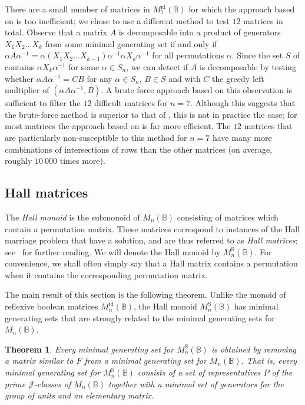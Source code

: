 \documentclass[11pt]{article}
\newtheorem{thm}{Theorem}[subsection]
\numberwithin{equation}{section}
\newcommand{\B}{\mathbb{B}}
\newcommand{\Bn}{M_n(\B)}
\newcommand{\Refln}{M_n^{\text{id}}(\B)}
\newcommand{\Refl}[1]{M_{#1}^{\text{id}}(\B)}
\newcommand{\Halln}{M_n^{\text{S}}(\B)}
\newcommand{\J}{\mathscr{J}}
\begin{document}
There are a small number of matrices in $\Refl{7}$ for which the approach based on
 is too inefficient; we chose to use a
different method to test $12$ matrices in total. Observe that a matrix $A$ is
decomposable into a product of generators $X_1 X_2 \ldots X_k$ from some minimal
generating set if and only if $\alpha A \alpha^{-1} = \alpha (X_1 X_2 \ldots
X_{k-1})\alpha^{-1}\alpha X_k \alpha^{-1}$ for all permutations $\alpha$. Since
the set $S$ of  contains $\alpha X_k
\alpha^{-1}$ for some $\alpha \in S_n$, we can detect if $A$ is decomposable by
testing whether $\alpha A \alpha^{-1} = CB$ for any $\alpha \in S_n$, $B \in S$
and with $C$ the greedy left multiplier of $(\alpha A \alpha^{-1}, B)$. A brute
force approach based on this observation is sufficient to filter the $12$
difficult matrices for $n = 7$. Although this suggests that the brute-force
method is superior to that of , this is not in
practice the case; for most matrices the approach based on
 is far more efficient. The $12$ matrices that
are particularly non-susceptible to this method for $n = 7$ have many more
combinations of intersections of rows than the other matrices (on average,
roughly $10\ 000$ times more).


\subsection{Hall matrices}
\label{sec:HallBoolMat}

The \emph{Hall monoid} is the submonoid of $\Bn$ consisting of matrices which
contain a permutation matrix. These matrices correspond to instances of the Hall
marriage problem that have a solution, and are thus referred to as \emph{Hall
  matrices}; see~\cite{Schwarz1973aa, Butler1974aa, Tan2000aa, Cho1993ab} for
further reading.
We will denote the Hall monoid by $\Halln$. For convenience, we shall often
simply say that a Hall matrix contains a permutation when it contains the
corresponding permutation matrix.

The main result of this section is the following theorem. Unlike the monoid of
reflexive boolean matrices $\Refln$, the Hall monoid $\Halln$ has minimal
generating sets that are strongly related to the minimal generating sets for
$\Bn$.
\begin{thm}
  Every minimal generating set for $\Halln$ is obtained by removing a
  matrix similar to $F$ from a minimal generating set for $\Bn$. That is, every
  minimal generating set for $\Halln$ consists of a set of representatives $P$
  of the prime $\J$-classes of $\Bn$ together with a minimal set of generators
  for the group of units and an elementary matrix.
\end{thm}
\end{document}
